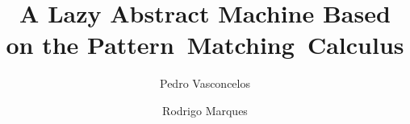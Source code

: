 \documentclass[sigconf]{acmart}
\author{Pedro Vasconcelos}
\affiliation{LIACC and DCC/FCUP}
\author{Rodrigo Marques}
\affiliation{LIACC}
\begin{document}
\title{A Lazy Abstract Machine Based on the Pattern~Matching~Calculus}

\maketitle











 
\end{document}
